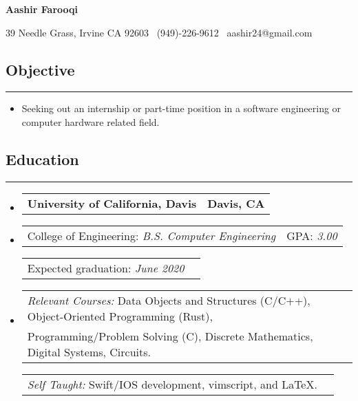 \documentclass[10pt,letterpaper]{article}
\makeatletter
\newcommand{\header}[2]
{
	\begin{tabular*}{\linewidth}{l @{\extracolsep{\fill}} r}
		#1 & #2 \\
	\end{tabular*}
}
\newcommand{\sectionbreak}
{
	\vspace{-1.2em}
	\rule{\textwidth}{1.7pt}
	\vspace{-1.7em}
}
\makeatother
\begin{document}
\begin{center}
{\LARGE \textbf{Aashir Farooqi}}

\vspace{0.5em}
39 Needle Grass, Irvine CA 92603 \textbar 
\ (949)-226-9612 \textbar 
\ aashir24@gmail.com \textbar
\ \href{https://github.com/AashPointO}{\emph{\underline{}}}
\\
\end{center}
\vspace{-1.5em}

\subsection*{Objective}
\sectionbreak

\begin{itemize}
	\item[] Seeking out an internship or part-time position in a software engineering or computer hardware related field.

\end{itemize}

\vspace{-1.5em}

\subsection*{Education}
\sectionbreak

\begin{itemize}

\item[] 
	\header 
		{\textbf{University of California, Davis}}
		{\textbf{Davis, CA}}
\item[]
	\header
		{College of Engineering: \emph{B.S. Computer Engineering}}
		{GPA: \emph{3.00}}
	\header
		{Expected graduation: \emph{June 2020}}	
		{}
\item[]
	\header
		{\emph{Relevant Courses:} Data Objects and Structures (C/C++), Object-Oriented Programming (Rust), \\ \hspace{7.25em} Programming/Problem Solving (C), Discrete Mathematics, Digital Systems, Circuits.} 
		{}
	\header
		{\emph{Self Taught:} \hspace{2.0em} Swift/IOS development, vimscript, and \LaTeX.}
		{}
	
\end{itemize}

\vspace{-2.5em}
\end{document}
